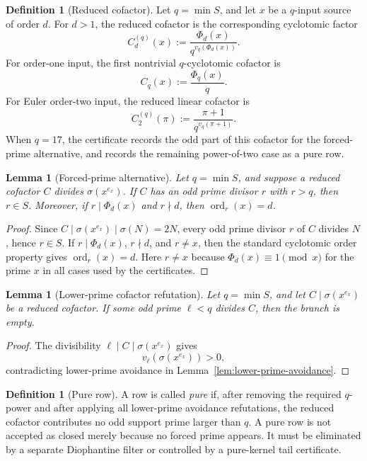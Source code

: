 \documentclass[11pt]{article}
\newtheorem{lemma}[theorem]{Lemma}
\theoremstyle{definition}
\newtheorem{definition}[theorem]{Definition}
\theoremstyle{remark}
\DeclareMathOperator{\ord}{ord}
\begin{document}
\begin{definition}[Reduced cofactor]
\label{def:reduced-cofactor}
Let \(q=\min S\), and let \(x\) be a \(q\)-input source of order \(d\).
For \(d>1\), the reduced cofactor is the corresponding cyclotomic factor
\[
  C_d^{(q)}(x)
  :=
  \frac{\Phi_d(x)}{q^{v_q(\Phi_d(x))}}.
\]
For order-one input, the first nontrivial \(q\)-cyclotomic cofactor is
\[
  C_q(x):=\frac{\Phi_q(x)}{q}.
\]
For Euler order-two input, the reduced linear cofactor is
\[
  C_2^{(q)}(\pi):=\frac{\pi+1}{q^{v_q(\pi+1)}}.
\]
When \(q=17\), the certificate records the odd part of this cofactor for the
forced-prime alternative, and records the remaining power-of-two case as a pure
row.
\end{definition}

\begin{lemma}[Forced-prime alternative]
\label{lem:forced-prime-alternative}
Let \(q=\min S\), and suppose a reduced cofactor \(C\) divides
\(\sigma(x^{e_x})\).  If \(C\) has an odd prime divisor \(r\) with \(r>q\), then
\(r\in S\).  Moreover, if \(r\mid\Phi_d(x)\) and \(r\nmid d\), then
\(\ord_r(x)=d\).
\end{lemma}

\begin{proof}
Since \(C\mid\sigma(x^{e_x})\mid\sigma(N)=2N\), every odd prime divisor
\(r\) of \(C\) divides \(N\), hence \(r\in S\).  If \(r\mid\Phi_d(x)\),
\(r\nmid d\), and \(r\ne x\), then the standard cyclotomic order property gives
\(\ord_r(x)=d\).  Here \(r\ne x\) because \(\Phi_d(x)\equiv1\pmod x\) for the
prime \(x\) in all cases used by the certificates.
\end{proof}

\begin{lemma}[Lower-prime cofactor refutation]
\label{lem:lower-prime-cofactor-refutation}
Let \(q=\min S\), and let \(C\mid\sigma(x^{e_x})\) be a reduced cofactor.  If
some odd prime \(\ell<q\) divides \(C\), then the branch is empty.
\end{lemma}

\begin{proof}
The divisibility \(\ell\mid C\mid\sigma(x^{e_x})\) gives
\[
  v_\ell(\sigma(x^{e_x}))>0,
\]
contradicting lower-prime avoidance in Lemma~\ref{lem:lower-prime-avoidance}.
\end{proof}

\begin{definition}[Pure row]
\label{def:pure-row}
A row is called \emph{pure} if, after removing the required \(q\)-power and
after applying all lower-prime avoidance refutations, the reduced cofactor
contributes no odd support prime larger than \(q\).  A pure row is not accepted
as closed merely because no forced prime appears.  It must be eliminated by a
separate Diophantine filter or controlled by a pure-kernel tail certificate.
\end{definition}
\end{document}
